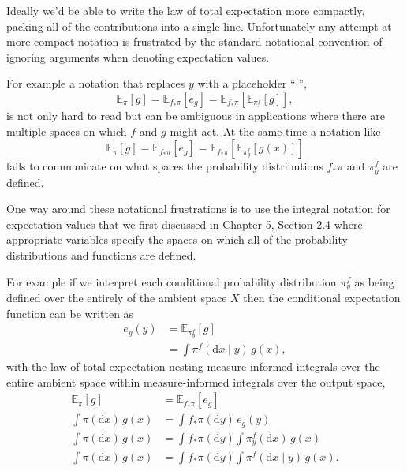 \documentclass[
  letterpaper,
  DIV=11,
  numbers=noendperiod]{scrartcl}
\begin{document}
Ideally we'd be able to write the law of total expectation more
compactly, packing all of the contributions into a single line.
Unfortunately any attempt at more compact notation is frustrated by the
standard notational convention of ignoring arguments when denoting
expectation values.

For example a notation that replaces \(y\) with a placeholder
``\(\cdot\)'', \[
\mathbb{E}_{\pi} \! \left[ g \right]
= \mathbb{E}_{ f_{*} \pi } \! \left[ e_{g} \right]
= \mathbb{E}_{ f_{*} \pi } \! \left[  \mathbb{E}_{\pi^{f}_{\cdot}} \! \left[ g \right]  \right],
\] is not only hard to read but can be ambiguous in applications where
there are multiple spaces on which \(f\) and \(g\) might act. At the
same time a notation like \[
\mathbb{E}_{\pi} \! \left[ g \right]
= \mathbb{E}_{ f_{*} \pi } \! \left[ e_{g} \right]
= \mathbb{E}_{ f_{*} \pi } \! \left[  \mathbb{E}_{\pi^{f}_{y}} \! \left[ g(x) \right]  \right]
\] fails to communicate on what spaces the probability distributions
\(f_{*} \pi\) and \(\pi^{f}_{y}\) are defined.

One way around these notational frustrations is to use the integral
notation for expectation values that we first discussed in
\href{https://betanalpha.github.io/assets/chapters_html/expectation_values.html\#sec:alt_notations}{Chapter
5, Section 2.4} where appropriate variables specify the spaces on which
all of the probability distributions and functions are defined.

For example if we interpret each conditional probability distribution
\(\pi^{f}_{y}\) as being defined over the entirely of the ambient space
\(X\) then the conditional expectation function can be written as
\begin{align*}
e_{g}(y)
&=
\mathbb{E}_{ \pi^{f}_{y} } \! \left[  g  \right]
\\
&=
\int \pi^{f}( \mathrm{d} x \mid y ) \, g(x),
\end{align*} with the law of total expectation nesting measure-informed
integrals over the entire ambient space within measure-informed
integrals over the output space, \begin{align*}
\mathbb{E}_{\pi} \! \left[ g \right]
&=
\mathbb{E}_{ f_{*} \pi } \! \left[ e_{g} \right]
\\
\int \pi( \mathrm{d} x ) \, g(x)
&=
\int f_{*} \pi (\mathrm{d} y) \, e_{g}(y)
\\
\int \pi( \mathrm{d} x ) \, g(x)
&=
\int f_{*} \pi (\mathrm{d} y)
\int \pi^{f}_{y}( \mathrm{d} x) \, g(x)
\\
\int \pi( \mathrm{d} x ) \, g(x)
&=
\int f_{*} \pi (\mathrm{d} y)
\int \pi^{f}( \mathrm{d} x \mid y ) \, g(x).
\end{align*}
\end{document}
